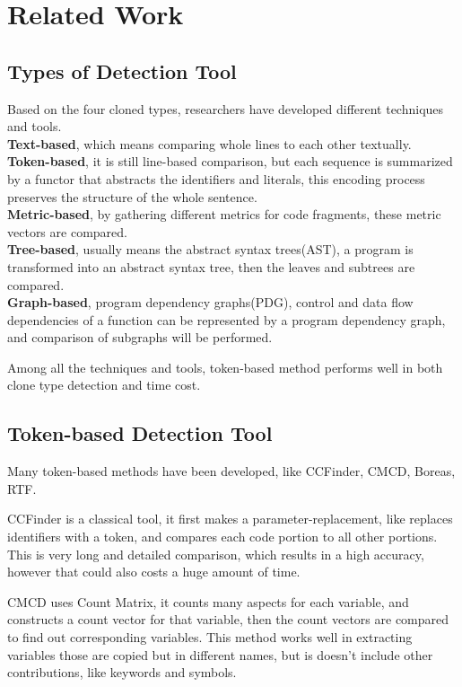\documentclass[../main.tex]{subfiles}
\begin{document}
\section{Related Work}

\subsection{Types of Detection Tool}

Based on the four cloned types, researchers have developed different techniques and tools. 
\\ \indent \textbf{Text-based}, which means comparing whole lines to each other textually. 
\\ \indent \textbf{Token-based}, it is still line-based comparison, but each sequence is summarized by a functor that abstracts the identifiers and literals, this encoding process preserves the structure of the whole sentence.
\\ \indent \textbf{Metric-based}, by gathering different metrics for code fragments, these metric vectors are compared.
\\ \indent \textbf{Tree-based}, usually means the abstract syntax trees(AST), a program is transformed into an abstract syntax tree, then the leaves and subtrees are compared.
\\ \indent \textbf{Graph-based}, program dependency graphs(PDG), control and data flow dependencies of a function can be represented by a program dependency graph, and comparison of subgraphs will be performed.

Among all the techniques and tools, token-based method performs well in both clone type detection and time cost.

\subsection{Token-based Detection Tool}

Many token-based methods have been developed, like CCFinder\cite{CCFinder}, CMCD\cite{CMCD},  Boreas\cite{Boreas}, RTF\cite{RTF}. 

CCFinder is a classical tool, it first makes a parameter-replacement, like replaces identifiers with a token, and compares each code portion to all other portions. This is very long and detailed comparison, which results in a high accuracy, however that could also costs a huge amount of time.

CMCD uses Count Matrix, it counts many aspects for each variable, and constructs a count vector for that variable, then the count vectors are compared to find out corresponding variables. This method works well in extracting variables those are copied but in different names, but is doesn't include other contributions, like keywords and symbols.
\end{document}
